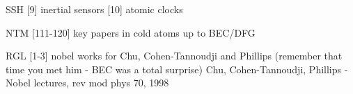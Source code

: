 

	SSH [9] inertial sensors [10] atomic clocks 

		NTM [111-120] key papers in cold atoms up to BEC/DFG 

	RGL [1-3] nobel works for Chu, Cohen-Tannoudji and Phillips (remember that time you met him - BEC was a total surprise) 
	Chu, Cohen-Tannoudji, Phillips - Nobel lectures, rev mod phys 70, 1998


